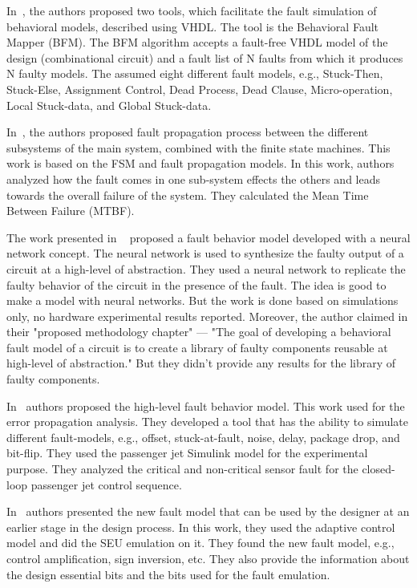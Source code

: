 In~\citep{hayne1999behavioral}, the authors proposed two tools, which facilitate the fault simulation of behavioral
models, described using VHDL. The tool is the Behavioral Fault Mapper (BFM). The BFM algorithm
accepts a fault-free VHDL model of the design (combinational circuit) and a fault list of N faults from
which it produces N faulty models. The assumed eight different fault models, e.g., Stuck-Then, Stuck-Else,
Assignment Control, Dead Process, Dead Clause, Micro-operation, Local Stuck-data, and Global Stuck-data. 

In~\citep{chen2017fault}, the authors proposed fault propagation process between the different subsystems of the
main system, combined with the finite state machines. This work is based on the FSM and fault propagation models. In this work, authors analyzed how the fault comes in one sub-system effects the others and leads towards the overall failure of the system. They calculated the Mean Time Between Failure (MTBF).


The work presented in ~\citep{mirzadeh2014modeling} proposed a fault behavior model developed with a neural network
concept. The neural network is used to synthesize the faulty output of a
circuit at a high-level of abstraction. They used a neural network to replicate the faulty behavior of the circuit in the presence of the fault. The idea is good to make a model with neural networks. But the work is done based on simulations only, no hardware experimental results reported. Moreover, the author claimed in their "proposed methodology chapter"  --- "The goal of developing a behavioral fault model of a circuit is to create a library of faulty components reusable at high-level of abstraction." But they didn't provide any results for the library of faulty components.


In~\citep{janschek2017errorsim} authors proposed the high-level fault behavior model. This work used for the error propagation analysis. They developed a tool that has the ability to simulate different fault-models, e.g., offset, stuck-at-fault, noise, delay, package drop, and bit-flip. They used the passenger jet Simulink model for the experimental purpose. They analyzed the critical and non-critical sensor fault for the closed-loop passenger jet control sequence.

In~\citep{hobeika2013flight} authors presented the new fault model that can be used by the designer at an earlier stage in the design process. In this work, they used the adaptive control model and did the SEU emulation on it. They found the new fault model, e.g., control amplification, sign inversion, etc. They also provide the information about the design essential bits and the bits used for the fault emulation.

